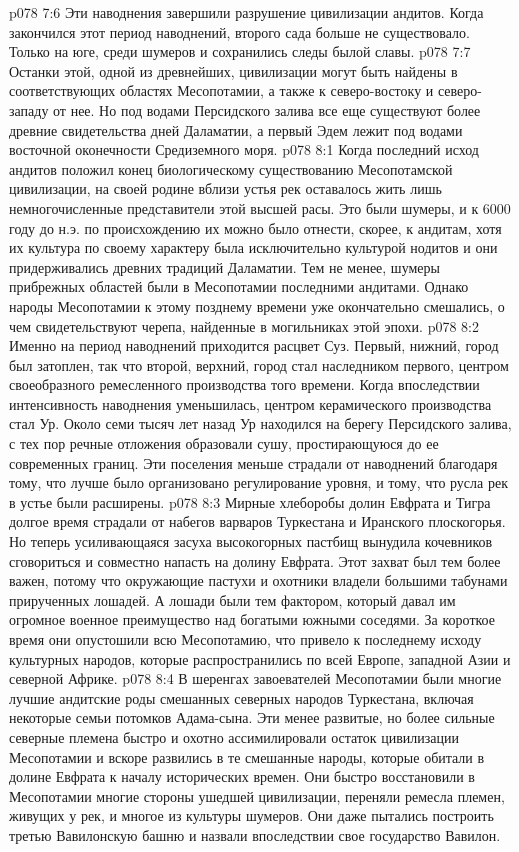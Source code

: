 \vs p078 7:6 \pc Эти наводнения завершили разрушение цивилизации андитов. Когда закончился этот период наводнений, второго сада больше не существовало. Только на юге, среди шумеров и сохранились следы былой славы.
\vs p078 7:7 Останки этой, одной из древнейших, цивилизации могут быть найдены в соответствующих областях Месопотамии, а также к северо\hyp{}востоку и северо\hyp{}западу от нее. Но под водами Персидского залива все еще существуют более древние свидетельства дней Даламатии, а первый Эдем лежит под водами восточной оконечности Средиземного моря.
\vs p078 8:1 Когда последний исход андитов положил конец биологическому существованию Месопотамской цивилизации, на своей родине вблизи устья рек оставалось жить лишь немногочисленные представители этой высшей расы. Это были шумеры, и к 6000 году до н.э. по происхождению их можно было отнести, скорее, к андитам, хотя их культура по своему характеру была исключительно культурой нодитов и они придерживались древних традиций Даламатии. Тем не менее, шумеры прибрежных областей были в Месопотамии последними андитами. Однако народы Месопотамии к этому позднему времени уже окончательно смешались, о чем свидетельствуют черепа, найденные в могильниках этой эпохи.
\vs p078 8:2 Именно на период наводнений приходится расцвет Суз. Первый, нижний, город был затоплен, так что второй, верхний, город стал наследником первого, центром своеобразного ремесленного производства того времени. Когда впоследствии интенсивность наводнения уменьшилась, центром керамического производства стал Ур. Около семи тысяч лет назад Ур находился на берегу Персидского залива, с тех пор речные отложения образовали сушу, простирающуюся до ее современных границ. Эти поселения меньше страдали от наводнений благодаря тому, что лучше было организовано регулирование уровня, и тому, что русла рек в устье были расширены.
\vs p078 8:3 \pc Мирные хлеборобы долин Евфрата и Тигра долгое время страдали от набегов варваров Туркестана и Иранского плоскогорья. Но теперь усиливающаяся засуха высокогорных пастбищ вынудила кочевников сговориться и совместно напасть на долину Евфрата. Этот захват был тем более важен, потому что окружающие пастухи и охотники владели большими табунами прирученных лошадей. А лошади были тем фактором, который давал им огромное военное преимущество над богатыми южными соседями. За короткое время они опустошили всю Месопотамию, что привело к последнему исходу культурных народов, которые распространились по всей Европе, западной Азии и северной Африке.
\vs p078 8:4 В шеренгах завоевателей Месопотамии были многие лучшие андитские роды смешанных северных народов Туркестана, включая некоторые семьи потомков Адама\hyp{}сына. Эти менее развитые, но более сильные северные племена быстро и охотно ассимилировали остаток цивилизации Месопотамии и вскоре развились в те смешанные народы, которые обитали в долине Евфрата к началу исторических времен. Они быстро восстановили в Месопотамии многие стороны ушедшей цивилизации, переняли ремесла племен, живущих у рек, и многое из культуры шумеров. Они даже пытались построить третью Вавилонскую башню и назвали впоследствии свое государство Вавилон.
